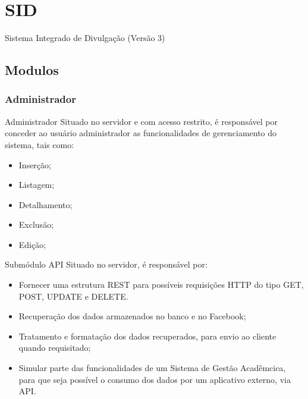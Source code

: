 \documentclass{aula-ifb}
\begin{document}
\section{SID}
\begin{frame}
\begin{center}
Sistema Integrado de Divulgação (Versão 3)
\end{center}
\end{frame}
\subsection{Modulos}
\subsubsection{Administrador}
\begin{frame}{Administrador}
Situado no servidor e com acesso restrito, é responsável por conceder ao usuário administrador as funcionalidades de gerenciamento do sistema, tais como:
\begin{itemize}
   \item Inserção;
   \item Listagem;
   \item Detalhamento;
   \item Exclusão;
   \item Edição;
\end{itemize}
\end{frame}

\begin{frame}{Submódulo API}
Situado no servidor, é responsável por:
	\begin{itemize}
		\item Fornecer uma estrutura REST para possíveis requisições HTTP do tipo GET, POST, UPDATE e DELETE.
		\vspace{10px}
   		\item Recuperação dos dados armazenados no banco e no Facebook;
   		\vspace{10px}
   		\item Tratamento e formatação dos dados recuperados, para envio ao cliente quando requisitado;
   		\vspace{10px}
   		\item Simular parte das funcionalidades de um Sistema de Gestão Acadêmcica, para que seja possível o consumo dos dados por um aplicativo externo, via API.
	\end{itemize}
\end{frame}
\end{document}
